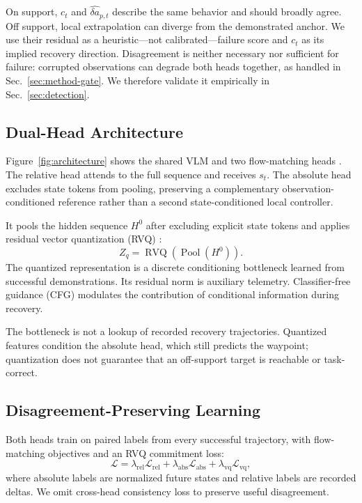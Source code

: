 \documentclass[letterpaper, 10 pt, conference]{ieeeconf}
\begin{document}
On support, $c_t$ and $\hat{\delta a}_{p,t}$ describe the same behavior and should broadly agree. Off support, local extrapolation can diverge from the demonstrated anchor. We use their residual as a heuristic---not calibrated---failure score and $c_t$ as its implied recovery direction. Disagreement is neither necessary nor sufficient for failure: corrupted observations can degrade both heads together, as handled in Sec.~\ref{sec:method-gate}. We therefore validate it empirically in Sec.~\ref{sec:detection}.

\subsection{Dual-Head Architecture}
Figure~\ref{fig:architecture} shows the shared VLM and two flow-matching heads \cite{diffusionpolicy,pi0}. The relative head attends to the full sequence and receives $s_t$. The absolute head excludes state tokens from pooling, preserving a complementary observation-conditioned reference rather than a second state-conditioned local controller.

It pools the hidden sequence $H^0$ after excluding explicit state tokens and applies residual vector quantization (RVQ) \cite{vqvae,rvq}:
\begin{equation}
    Z_q=\operatorname{RVQ}\!\left(\operatorname{Pool}(H^0)\right).
\end{equation}
The quantized representation is a discrete conditioning bottleneck learned from successful demonstrations. Its residual norm is auxiliary telemetry. Classifier-free guidance (CFG) \cite{cfg} modulates the contribution of conditional information during recovery.

The bottleneck is not a lookup of recorded recovery trajectories. Quantized features condition the absolute head, which still predicts the waypoint; quantization does not guarantee that an off-support target is reachable or task-correct.

\subsection{Disagreement-Preserving Learning}
\label{sec:learning}
Both heads train on paired labels from every successful trajectory, with flow-matching objectives and an RVQ commitment loss:
\begin{equation}
    \mathcal{L} =
    \lambda_{\mathrm{rel}}\mathcal{L}_{\mathrm{rel}}
    + \lambda_{\mathrm{abs}}\mathcal{L}_{\mathrm{abs}}
    + \lambda_{\mathrm{vq}}\mathcal{L}_{\mathrm{vq}},
\label{eq:training_loss}
\end{equation}
where absolute labels are normalized future states and relative labels are recorded deltas. We omit cross-head consistency loss to preserve useful disagreement.
\end{document}
